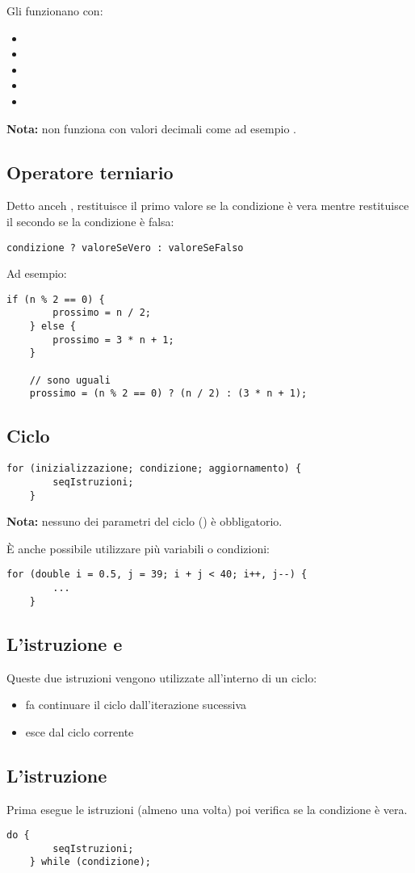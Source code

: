 \documentclass[../main.tex]{subfiles}
\begin{document}
\pagebreak
Gli  funzionano con:
\begin{itemize}
    \item {}
    \item {}
    \item {}
    \item {}
    \item {}
\end{itemize}
\textbf{Nota:} non funziona con valori decimali come ad esempio .

\vspace{1cm}
\subsection{Operatore terniario}
Detto anceh , restituisce il primo valore se la condizione è vera mentre restituisce il secondo se la condizione è falsa:
\begin{lstlisting}[style=java]
    condizione ? valoreSeVero : valoreSeFalso
\end{lstlisting}

Ad esempio:
\begin{lstlisting}[style=java]
    if (n % 2 == 0) {
        prossimo = n / 2;
    } else {
        prossimo = 3 * n + 1;
    }

    // sono uguali
    prossimo = (n % 2 == 0) ? (n / 2) : (3 * n + 1);
\end{lstlisting}

\vspace{1cm}
\subsection{Ciclo }
\begin{lstlisting}[style=java]
    for (inizializzazione; condizione; aggiornamento) {
        seqIstruzioni;
    }
\end{lstlisting}
\textbf{Nota:} nessuno dei parametri del ciclo  () è obbligatorio.

È anche possibile utilizzare più variabili o condizioni:
\begin{lstlisting}[style=java]
    for (double i = 0.5, j = 39; i + j < 40; i++, j--) {
        ...
    }
\end{lstlisting}

\vspace{1cm}
\subsection{L'istruzione  e }
Queste due istruzioni vengono utilizzate all'interno di un ciclo:
\begin{itemize}
    \item {} fa continuare il ciclo dall'iterazione sucessiva
    \item {} esce dal ciclo corrente
\end{itemize}

\subsection{L'istruzione }
Prima esegue le istruzioni (almeno una volta) poi verifica se la condizione è vera.
\begin{lstlisting}[style=java]
    do {
        seqIstruzioni;
    } while (condizione);
\end{lstlisting}
\end{document}
